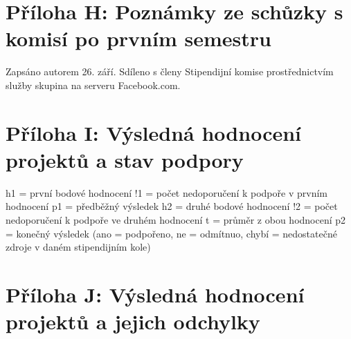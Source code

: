 

\cleartoleftpage
\section{Příloha H: Poznámky ze schůzky s komisí po prvním semestru}

Zapsáno autorem 26. září. Sdíleno s členy Stipendijní komise prostřednictvím služby skupina na serveru Facebook.com.



\cleartoleftpage
\section{Příloha I: Výsledná hodnocení projektů a stav podpory}

h1 = první bodové hodnocení \newline
!1 = počet nedoporučení k podpoře v prvním hodnocení \newline
p1 = předběžný výsledek \newline
h2 = druhé bodové hodnocení \newline
!2 = počet nedoporučení k podpoře ve druhém hodnocení
t = průměr z obou hodnocení \newline
p2 = konečný výsledek (ano = podpořeno, ne = odmítnuo, chybí = nedostatečné zdroje v daném stipendijním kole)


\cleartoleftpage
\section{Příloha J: Výsledná hodnocení projektů a jejich odchylky}








